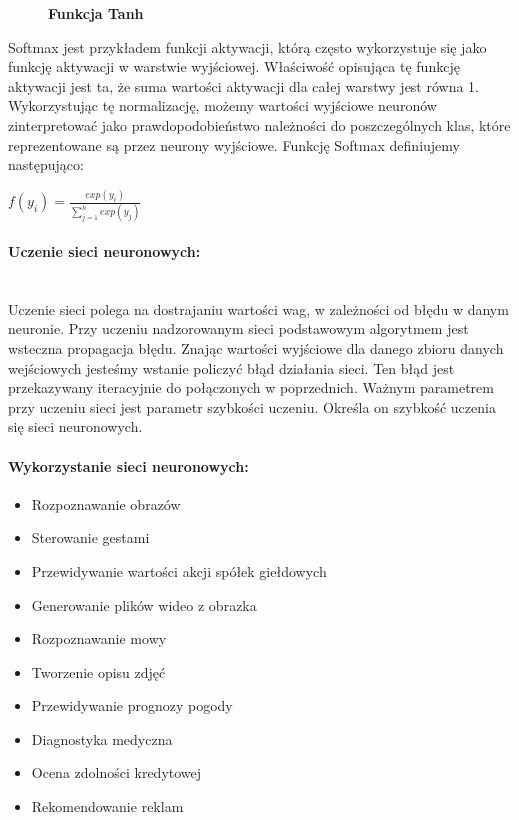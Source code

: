 \documentclass[a4paper,12pt,twoside,openany]{report}
\newcommand{\ImgPath}{.}
\begin{document}
\begin{figure}[H]
	\centering
	\caption{  \textbf{Funkcja Tanh}}
\end{figure}

Softmax jest przykładem funkcji aktywacji, którą często wykorzystuje się jako funkcję aktywacji w warstwie wyjściowej. Właściwość opisująca tę funkcję aktywacji jest ta, że suma wartości aktywacji dla całej warstwy jest równa 1. Wykorzystując tę normalizację, możemy wartości wyjściowe neuronów zinterpretować jako prawdopodobieństwo należności do poszczególnych klas, które reprezentowane są przez neurony wyjściowe. Funkcję Softmax definiujemy następująco: \\ 
\begin{center}
	{\large $ f(y_{i}) = \frac{exp(y_{i})}
		{\sum_{j=1}^{n} exp(y_{j})}
	$\par}
\end{center}

\paragraph{Uczenie sieci neuronowych:}
\mbox{} \\
\indent
Uczenie sieci polega na dostrajaniu wartości wag, w zależności od błędu w danym neuronie. Przy uczeniu nadzorowanym sieci podstawowym algorytmem jest wsteczna propagacja błędu. Znając wartości wyjściowe dla danego zbioru danych wejściowych jesteśmy wstanie policzyć błąd działania sieci. Ten błąd jest przekazywany iteracyjnie do połączonych w poprzednich. Ważnym parametrem przy uczeniu sieci jest parametr szybkości uczeniu. Określa on szybkość uczenia się sieci neuronowych. 

\paragraph{Wykorzystanie sieci neuronowych:}
\begin{itemize}
	\item Rozpoznawanie obrazów
	\item Sterowanie gestami
	\item Przewidywanie wartości akcji spółek giełdowych
	\item Generowanie plików wideo z obrazka
	\item Rozpoznawanie mowy
	\item Tworzenie opisu zdjęć
	\item Przewidywanie prognozy pogody
	\item Diagnostyka medyczna
	\item Ocena zdolności kredytowej
	\item Rekomendowanie reklam
	
\end{itemize}
\end{document}
